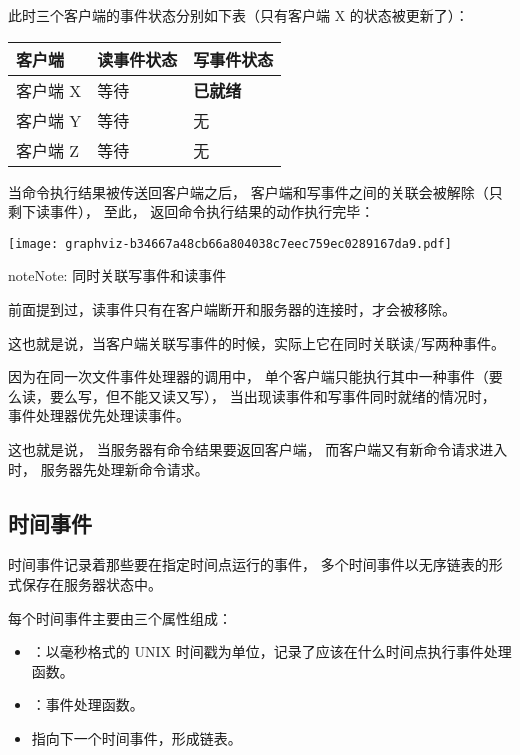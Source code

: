 \documentclass[a4paper,11pt,english]{sphinxmanual}
\begin{document}
此时三个客户端的事件状态分别如下表（只有客户端 X 的状态被更新了）：

\begin{tabulary}{\linewidth}{|L|L|L|}
\hline

客户端
 & 
读事件状态
 & 
写事件状态
\\\hline

客户端 X
 & 
等待
 & 
\textbf{已就绪}
\\\hline

客户端 Y
 & 
等待
 & 
无
\\\hline

客户端 Z
 & 
等待
 & 
无
\\\hline
\end{tabulary}


当命令执行结果被传送回客户端之后，
客户端和写事件之间的关联会被解除（只剩下读事件），
至此，
返回命令执行结果的动作执行完毕：

\texttt{[image: graphviz-b34667a48cb66a804038c7eec759ec0289167da9.pdf]}

\begin{notice}{note}{Note:}
同时关联写事件和读事件

前面提到过，读事件只有在客户端断开和服务器的连接时，才会被移除。

这也就是说，当客户端关联写事件的时候，实际上它在同时关联读/写两种事件。

因为在同一次文件事件处理器的调用中，
单个客户端只能执行其中一种事件（要么读，要么写，但不能又读又写），
当出现读事件和写事件同时就绪的情况时，
事件处理器优先处理读事件。

这也就是说，
当服务器有命令结果要返回客户端，
而客户端又有新命令请求进入时，
服务器先处理新命令请求。
\end{notice}


\subsection{时间事件}
\label{internal/ae:id5}
时间事件记录着那些要在指定时间点运行的事件，
多个时间事件以无序链表的形式保存在服务器状态中。

每个时间事件主要由三个属性组成：
\begin{itemize}
\item {} 
 ：以毫秒格式的 UNIX 时间戳为单位，记录了应该在什么时间点执行事件处理函数。

\item {} 
 ：事件处理函数。

\item {} 
 指向下一个时间事件，形成链表。

\end{itemize}
\end{document}
